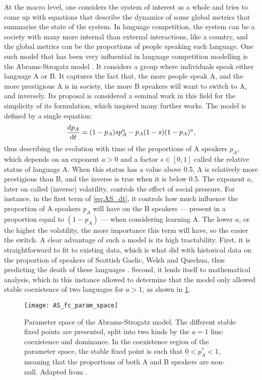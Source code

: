\documentclass[../thesis.tex]{subfiles}
\begin{document}
At the macro level, one considers the system of interest as a whole and tries to come up
with equations that describe the dynamics of some global metrics that summarise the
state of the system. In language competition, the system can be a society with many more
internal than external interactions, like a country, and the global metrics can be the
proportions of people speaking each language. One such model that has been very
influential in language competition modelling is the Abrams-Strogatz model
\cite{AbramsModellingDynamics2003}. It considers a group where individuals speak either
language A or B. It captures the fact that, the more people speak A, and the more
prestigious A is in society, the more B speakers will want to switch to A, and
inversely. Its proposal is considered a seminal work in this field for the simplicity of
its formulation, which inspired many further works. The model is defined by a single
equation:
\begin{equation}
  \label{eq:AS_dt}
  \dv{p_A}{t} = (1 - p_A) s p_A^a - p_A (1 - s) (1 - p_A)^a,
\end{equation}
thus describing the evolution with time of the proportions of A speakers $p_A$, which
depends on an exponent $a > 0$ and a factor $s \in [0, 1]$ called the relative status of
language A. When this status has a value above 0.5, A is relatively more prestigious
than B, and the inverse is true when it is below 0.5. The exponent $a$, later on called
(inverse) volatility, controls the effect of social pressure. For instance, in the first
term of \cref{eq:AS_dt}, it controls how much influence the proportion of A
speakers $p_A$ will have on the B speakers --- present in a proportion equal to $(1 -
p_A)$ --- when considering learning A. The lower $a$, or the higher the volatility, the
more importance this term will have, so the easier the switch. A clear advantage of such
a model is its high tractability. First, it is straightforward to fit to existing data,
which is what \citeauthor{AbramsModellingDynamics2003} did with historical data on the
proportion of speakers of Scottish Gaelic, Welsh and Quechua, thus predicting the death
of these languages \cite{AbramsModellingDynamics2003}. Second, it lends itself to
mathematical analysis, which in this instance allowed \citeauthor{VazquezAgentBased2010}
to determine that the model only allowed stable coexistence of two languages for $a > 1$, as shown in \cref{fig:AS_fc_param_space}.
\begin{figure}
\centering
  \texttt{[image: AS\_fc\_param\_space]}
  \caption{Parameter space of the Abrams-Strogatz model. The different stable fixed points are presented, split into two kinds by the $a = 1$ line: coexistence and dominance. In the coexistence region of the parameter space, the stable fixed point is such that $0 < p_A^* < 1$, meaning that the proportions of both A and B speakers are non-null. Adapted from \cite{VazquezAgentBased2010}.}
  \label{fig:AS_fc_param_space}
\end{figure}
\end{document}
